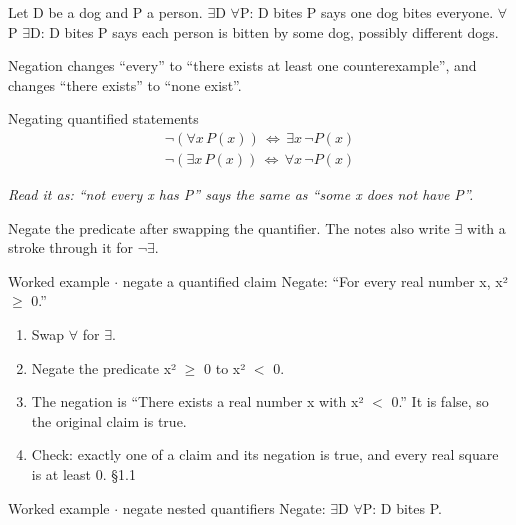 \documentclass[11pt]{article}
\begin{document}
\begin{keepsection}
\begin{keepsection}
Let D be a dog and P a person. \ensuremath{\exists}D \ensuremath{\forall}P: D bites P says one dog bites everyone. \ensuremath{\forall}P \ensuremath{\exists}D: D bites P says each person is bitten by some dog, possibly different dogs.

Negation changes “every” to “there exists at least one counterexample”, and changes “there exists” to “none exist”.

\begin{equationcard}{Negating quantified statements}
\[ \begin{gathered} \neg (\forall {x}\, {P}({x}))\, \Leftrightarrow \, \exists {x}\, \neg {P}({x}) \\ \neg (\exists {x}\, {P}({x}))\, \Leftrightarrow \, \forall {x}\, \neg {P}({x}) \end{gathered} \]
{\small \emph{Read it as: “not every x has P” says the same as “some x does not have P”.}\par Negate the predicate after swapping the quantifier. The notes also write \ensuremath{\exists} with a stroke through it for \ensuremath{\neg}\ensuremath{\exists}.}
\end{equationcard}

\begin{workedbox}{Worked example \ensuremath{\cdot} negate a quantified claim}
Negate: “For every real number x, x² \ensuremath{\geq} 0.”

\begin{enumerate}
\item Swap \ensuremath{\forall} for \ensuremath{\exists}.
\item Negate the predicate x² \ensuremath{\geq} 0 to x² \ensuremath{<} 0.
\item The negation is “There exists a real number x with x² \ensuremath{<} 0.” It is false, so the original claim is true.
\item Check: exactly one of a claim and its negation is true, and every real square is at least 0. \hfill{\small\color{FAUblue}§1.1}
\end{enumerate}
\end{workedbox}

\begin{workedbox}{Worked example \ensuremath{\cdot} negate nested quantifiers}
Negate: \ensuremath{\exists}D \ensuremath{\forall}P: D bites P.


\end{workedbox}
\end{keepsection}
\end{keepsection}
\end{document}
